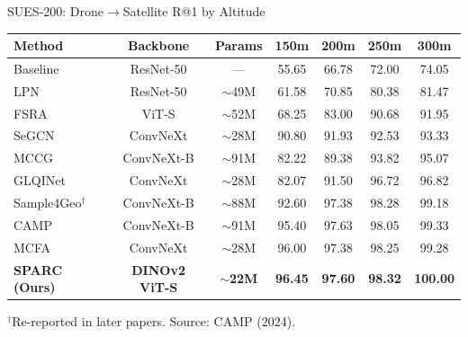 \documentclass[aspectratio=169, 11pt]{beamer}
\begin{document}
\begin{frame}{SUES-200: Drone$\to$Satellite R@1 by Altitude}
\footnotesize
\centering
\begin{tabular}{@{}l c c c c c c@{}}
  \toprule
  \textbf{Method} & \textbf{Backbone} & \textbf{Params} & \textbf{150m} & \textbf{200m} & \textbf{250m} & \textbf{300m} \\
  \midrule
  Baseline & ResNet-50 & --- & 55.65 & 66.78 & 72.00 & 74.05 \\
  LPN & ResNet-50 & $\sim$49M & 61.58 & 70.85 & 80.38 & 81.47 \\
  FSRA & ViT-S & $\sim$52M & 68.25 & 83.00 & 90.68 & 91.95 \\
  SeGCN & ConvNeXt & $\sim$28M & 90.80 & 91.93 & 92.53 & 93.33 \\
  MCCG & ConvNeXt-B & $\sim$91M & 82.22 & 89.38 & 93.82 & 95.07 \\
  GLQINet & ConvNeXt & $\sim$28M & 82.07 & 91.50 & 96.72 & 96.82 \\
  Sample4Geo$^\dagger$ & ConvNeXt-B & $\sim$88M & 92.60 & 97.38 & 98.28 & 99.18 \\
  CAMP & ConvNeXt-B & $\sim$91M & 95.40 & 97.63 & 98.05 & 99.33 \\
  MCFA & ConvNeXt & $\sim$28M & 96.00 & 97.38 & 98.25 & 99.28 \\
  \midrule
  \rowcolor{successgreen!20}
  \textbf{SPARC (Ours)} & \textbf{DINOv2 ViT-S} & \textbf{$\sim$22M} & \textbf{96.45} & \textbf{97.60} & \textbf{98.32} & \textbf{100.00} \\
  \bottomrule
\end{tabular}

\vspace{0.1cm}
{\tiny $^\dagger$Re-reported in later papers. Source: CAMP (2024).}

\vspace{0.2cm}
\end{frame}
\end{document}
